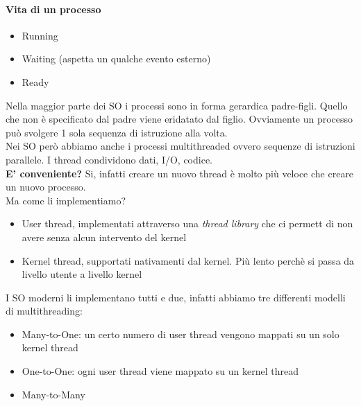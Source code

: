 \documentclass[a4paper,12pt]{article}
\begin{document}
\paragraph{Vita di un processo}
\begin{itemize}
  \item Running
  \item Waiting (aspetta un qualche evento esterno)
  \item Ready
\end{itemize}
Nella maggior parte dei SO i processi sono in forma gerardica padre-figli. Quello che non è specificato dal padre viene eridatato dal figlio. Ovviamente un processo può svolgere 1 sola sequenza di istruzione alla volta.\\
Nei SO però abbiamo anche i processi multithreaded ovvero sequenze di istruzioni parallele. I thread condividono dati, I/O, codice. \\
\textbf{E' conveniente?} Si, infatti creare un nuovo thread è molto più veloce che creare un nuovo processo. \\
Ma come li implementiamo?
\begin{itemize}
  \item User thread, implementati attraverso una \textit{thread library} che ci permett di non avere senza alcun intervento del kernel
  \item Kernel thread, supportati nativamenti dal kernel. Più lento perchè si passa da livello utente a livello kernel
\end{itemize}
I SO moderni li implementano tutti e due, infatti abbiamo tre differenti modelli di multithreading:
\begin{itemize}
  \item Many-to-One: un certo numero di user thread vengono mappati su un solo kernel thread
  \item One-to-One: ogni user thread viene mappato su un kernel thread
  \item Many-to-Many
\end{itemize}
\end{document}
